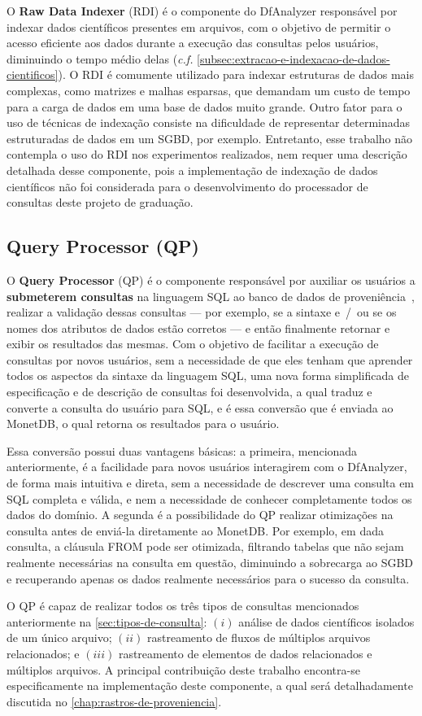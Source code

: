 O \textbf{Raw Data Indexer} (RDI) é o componente do DfAnalyzer responsável por indexar dados científicos presentes em arquivos, com o objetivo de permitir o acesso eficiente aos dados durante a execução das consultas pelos usuários, diminuindo o tempo médio delas (\textit{c.f.} \autoref{subsec:extracao-e-indexacao-de-dados-cientificos}). O RDI é comumente utilizado para indexar estruturas de dados mais complexas, como matrizes e malhas esparsas, que demandam um custo de tempo para a carga de dados em uma base de dados muito grande. Outro fator para o uso de técnicas de indexação consiste na dificuldade de representar determinadas estruturadas de dados em um SGBD, por exemplo. Entretanto, esse trabalho não contempla o uso do RDI nos experimentos realizados, nem requer uma descrição detalhada desse componente, pois a implementação de indexação de dados científicos não foi considerada para o desenvolvimento do processador de consultas deste projeto de graduação.

\subsection{Query Processor (QP)}

O \textbf{Query Processor} (QP) é o componente responsável por auxiliar os usuários a \textbf{submeterem consultas} na linguagem SQL ao banco de dados de proveniência~\cite{silva2016situ}, realizar a validação dessas consultas --- por exemplo, se a sintaxe e~/~ou se os nomes dos atributos de dados estão corretos --- e então finalmente retornar e exibir os resultados das mesmas. Com o objetivo de facilitar a execução de consultas por novos usuários, sem a necessidade de que eles tenham que aprender todos os aspectos da sintaxe da linguagem SQL, uma nova forma simplificada de especificação e de descrição de consultas foi desenvolvida, a qual traduz e converte a consulta do usuário para SQL, e é essa conversão que é enviada ao MonetDB, o qual retorna os resultados para o usuário.

Essa conversão possui duas vantagens básicas: a primeira, mencionada anteriormente, é a facilidade para novos usuários interagirem com o DfAnalyzer, de forma mais intuitiva e direta, sem a necessidade de descrever uma consulta em SQL completa e válida, e nem a necessidade de conhecer completamente todos os dados do domínio. A segunda é a possibilidade do QP realizar otimizações na consulta antes de enviá-la diretamente ao MonetDB. Por exemplo, em dada consulta, a cláusula \textsc{FROM} pode ser otimizada, filtrando tabelas que não sejam realmente necessárias na consulta em questão, diminuindo a sobrecarga ao SGBD e recuperando apenas os dados realmente necessários para o sucesso da consulta.

O QP é capaz de realizar todos os três tipos de consultas mencionados anteriormente na \autoref{sec:tipos-de-consulta}: \((i)\) análise de dados científicos isolados de um único arquivo; \((ii)\) rastreamento de fluxos de múltiplos arquivos relacionados; e \((iii)\) rastreamento de elementos de dados relacionados e múltiplos arquivos. 
A principal contribuição deste trabalho encontra-se especificamente na implementação deste componente, a qual será detalhadamente discutida no \autoref{chap:rastros-de-proveniencia}.